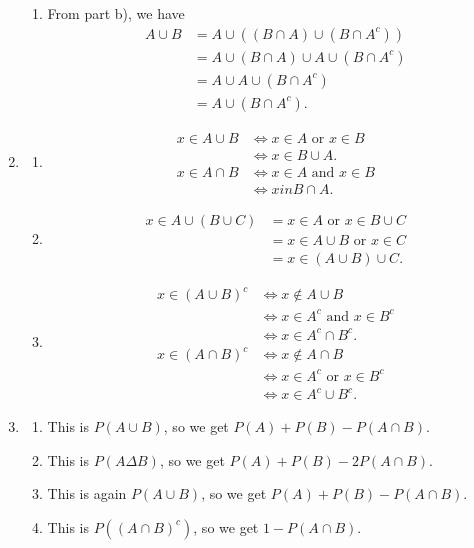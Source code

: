 \documentclass{article}
\begin{document}
\begin{enumerate}
\begin{enumerate}
        \item From part b), we have \begin{align*}
            A \cup B
            &= A \cup ((B \cap A) \cup (B \cap A^c)) \\
            &= A \cup (B \cap A) \cup A \cup (B \cap A^c) \\
            &= A \cup A \cup (B \cap A^c) \\
            &= A \cup (B \cap A^c).
        \end{align*}
    \end{enumerate}

    \item \begin{enumerate}
        \item \begin{align*}
            x \in A \cup B
            &\iff x \in A \text{ or } x \in B \\
            &\iff x \in B \cup A. \\
            x \in A \cap B
            &\iff x \in A \text{ and } x \in B \\
            &\iff x in B \cap A.
        \end{align*}

        \item \begin{align*}
            x \in A \cup (B \cup C)
            &= x \in A \text{ or } x \in B \cup C \\
            &= x \in A \cup B \text{ or } x \in C \\
            &= x \in (A \cup B) \cup C.
        \end{align*}

        \item \begin{align*}
            x \in (A \cup B)^{c}
            &\iff x \notin A \cup B \\
            &\iff x \in A^c \text{ and } x \in B^c \\
            &\iff x \in A^c \cap B^c. \\
            x \in (A \cap B)^c
            &\iff x \notin A \cap B \\
            &\iff x \in A^c \text{ or } x \in B^c \\
            &\iff x \in A^c \cup B^c.
        \end{align*}
    \end{enumerate}

    \item \begin{enumerate}
        \item This is $P(A \cup B)$, so we get $P(A) + P(B) - P(A \cap B)$.
        \item This is $P(A \Delta B)$, so we get $P(A) + P(B) - 2P(A \cap B)$.
        \item This is again $P(A \cup B)$, so we get $P(A) + P(B) - P(A \cap B)$.
        \item This is $P((A \cap B)^c)$, so we get $1 - P(A \cap B)$.
    \end{enumerate}


\end{enumerate}
\end{document}
